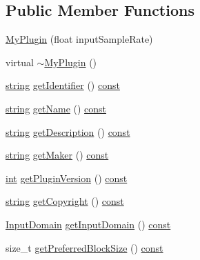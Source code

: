 \subsection*{Public Member Functions}
\begin{DoxyCompactItemize}
\item 
\hyperlink{class_my_plugin_a190b665cb1688d8dd09b2f9bb59eabcf}{My\+Plugin} (float input\+Sample\+Rate)
\item 
virtual \hyperlink{class_my_plugin_ac79e4db12ed1764dda2e43a671c23198}{$\sim$\+My\+Plugin} ()
\item 
\hyperlink{test__lib_f_l_a_c_2format_8c_ab02026ad0de9fb6c1b4233deb0a00c75}{string} \hyperlink{class_my_plugin_a65cc80b7044e4b69d4618709a9562b63}{get\+Identifier} () \hyperlink{getopt1_8c_a2c212835823e3c54a8ab6d95c652660e}{const} 
\item 
\hyperlink{test__lib_f_l_a_c_2format_8c_ab02026ad0de9fb6c1b4233deb0a00c75}{string} \hyperlink{class_my_plugin_aa29c4758d0441cea22c5f677bc0533c9}{get\+Name} () \hyperlink{getopt1_8c_a2c212835823e3c54a8ab6d95c652660e}{const} 
\item 
\hyperlink{test__lib_f_l_a_c_2format_8c_ab02026ad0de9fb6c1b4233deb0a00c75}{string} \hyperlink{class_my_plugin_a714bfe4d7c447767a9d24a626e702d3f}{get\+Description} () \hyperlink{getopt1_8c_a2c212835823e3c54a8ab6d95c652660e}{const} 
\item 
\hyperlink{test__lib_f_l_a_c_2format_8c_ab02026ad0de9fb6c1b4233deb0a00c75}{string} \hyperlink{class_my_plugin_a35aabf14bf6ecd67046849ee57e703e1}{get\+Maker} () \hyperlink{getopt1_8c_a2c212835823e3c54a8ab6d95c652660e}{const} 
\item 
\hyperlink{xmltok_8h_a5a0d4a5641ce434f1d23533f2b2e6653}{int} \hyperlink{class_my_plugin_ac84f4863a39b25bb04c02a5188bf35d4}{get\+Plugin\+Version} () \hyperlink{getopt1_8c_a2c212835823e3c54a8ab6d95c652660e}{const} 
\item 
\hyperlink{test__lib_f_l_a_c_2format_8c_ab02026ad0de9fb6c1b4233deb0a00c75}{string} \hyperlink{class_my_plugin_aaf4e313da4a5301229130e84bdf075a5}{get\+Copyright} () \hyperlink{getopt1_8c_a2c212835823e3c54a8ab6d95c652660e}{const} 
\item 
\hyperlink{class_vamp_1_1_plugin_a39cb7649d6dcc20e4cb1640cd55907bc}{Input\+Domain} \hyperlink{class_my_plugin_a5f9677ca1cc7f2df4a30101cf2b89611}{get\+Input\+Domain} () \hyperlink{getopt1_8c_a2c212835823e3c54a8ab6d95c652660e}{const} 
\item 
size\+\_\+t \hyperlink{class_my_plugin_aa9763dd2f57976688be8dc209c5665df}{get\+Preferred\+Block\+Size} () \hyperlink{getopt1_8c_a2c212835823e3c54a8ab6d95c652660e}{const} 

\end{DoxyCompactItemize}
